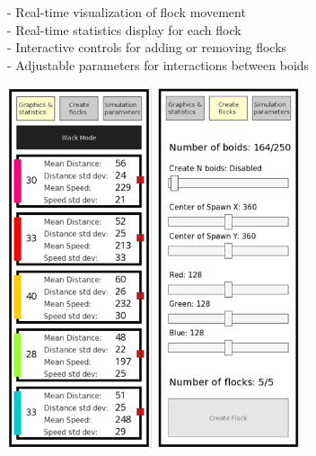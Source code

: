 \documentclass[10pt,a4paper]{article}
\begin{document}

- Real-time visualization of flock movement \\
- Real-time statistics display for each flock \\
- Interactive controls for adding or removing flocks \\
- Adjustable parameters for interactions between boids \\

\begin{center}
    \includegraphics[width=0.32\textwidth]{../images/option1.png}
    \includegraphics[width=0.32\textwidth]{../images/option2.png}

\end{center}
\end{document}
